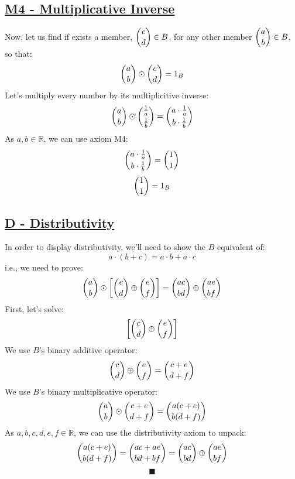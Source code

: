 \documentclass[a4paper, 12pt]{article}
\newcommand{\sub}[1]{\subsection{\underline{#1}}}
\newcommand{\?}{\stackrel{?}{=}}
\newcommand{\R}{\ensuremath{\mathbb{R}}}
\renewcommand{\qed}{$$\blacksquare$$}
\begin{document}
    \sub{M4 - Multiplicative Inverse}
        Now, let us find if exists a member, $\dbinom{c}{d} \in{B}$, for any other member $\dbinom{a}{b} \in{B}$, so that:
        $$ \dbinom{a}{b}\odot\dbinom{c}{d} = 1_{B} $$
        Let's multiply every number by its multiplicitive inverse:
        $$ \dbinom{a}{b}\odot\dbinom{\frac{1}{a}}{\frac{1}{b}}=\dbinom{a\cdot{\frac{1}{a}}}{b\cdot{\frac{1}{b}}} $$
        As $a,b \in {\R}$, we can use axiom M4:
        $$ \dbinom{a\cdot{\frac{1}{a}}}{b\cdot{\frac{1}{b}}} = \dbinom{1}{1} $$
        $$ \dbinom{1}{1} = 1_{B} $$

    \sub{D - Distributivity}
    In order to display distributivity, we'll need to show the $B$ equivalent of:
    $$ a\cdot{(b+c)}=a\cdot{b}+a\cdot{c} $$
    i.e., we need to prove:
    $$ \dbinom{a}{b} \odot \bigg{[} \dbinom{c}{d} \oplus \dbinom{e}{f} \bigg{]} = \dbinom{ac}{bd} \oplus \dbinom{ae}{bf} $$
    First, let's solve: $$ \bigg{[} \dbinom{c}{d} \oplus \dbinom{e}{f} \bigg{]} $$
    We use $B$'s binary additive operator:
    $$ \dbinom{c}{d} \oplus \dbinom{e}{f} = \dbinom{c+e}{d+f} $$
    We use $B$'s binary multiplicative operator: $$ \dbinom{a}{b} \odot \dbinom{c+e}{d+f} = \dbinom{a(c+e)}{b(d+f)} $$
    As $a,b,c,d,e,f \in {\R}$, we can use the distributivity axiom to unpack:
    $$ \dbinom{a(c+e)}{b(d+f)} = \dbinom{ac+ae}{bd+bf} = \dbinom{ac}{bd} \oplus \dbinom{ae}{bf} $$
    \qed
    \pagebreak

\end{document}
